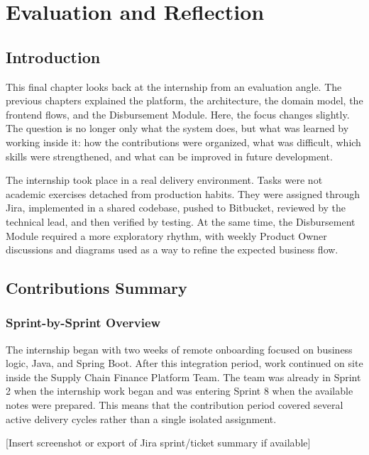 \chapter{Evaluation and Reflection}
\label{chap:evaluation_reflection}

\section{Introduction}
\label{sec:ch6_introduction}

This final chapter looks back at the internship from an evaluation angle. The previous chapters explained the platform, the architecture, the domain model, the frontend flows, and the Disbursement Module. Here, the focus changes slightly. The question is no longer only what the system does, but what was learned by working inside it: how the contributions were organized, what was difficult, which skills were strengthened, and what can be improved in future development.

The internship took place in a real delivery environment. Tasks were not academic exercises detached from production habits. They were assigned through Jira, implemented in a shared codebase, pushed to Bitbucket, reviewed by the technical lead, and then verified by testing. At the same time, the Disbursement Module required a more exploratory rhythm, with weekly Product Owner discussions and diagrams used as a way to refine the expected business flow.

\section{Contributions Summary}
\label{sec:ch6_contributions_summary}

\subsection{Sprint-by-Sprint Overview}
\label{subsec:ch6_sprint_overview}

The internship began with two weeks of remote onboarding focused on business logic, Java, and Spring Boot. After this integration period, work continued on site inside the Supply Chain Finance Platform Team. The team was already in Sprint 2 when the internship work began and was entering Sprint 8 when the available notes were prepared. This means that the contribution period covered several active delivery cycles rather than a single isolated assignment.

[Insert screenshot or export of Jira sprint/ticket summary if available]

